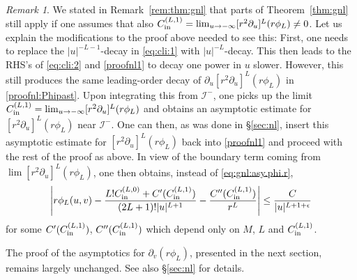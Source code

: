 \documentclass[11pt,english]{article}
\numberwithin{equation}{section}
\theoremstyle{remark}
\newtheorem{rem}{Remark}[section]
\theoremstyle{plain}
\theoremstyle{remark}
\newcommand{\pu}{\partial_u}
\newcommand{\pv}{\partial_v}
\renewcommand{\(}{\left(}
\renewcommand{\)}{\right)}
\begin{document}
\begin{rem}\label{rem:9}
We stated in Remark~\ref{rem:thm:gnl} that parts of Theorem~\ref{thm:gnl} still apply if one assumes that also $\cl{1}=\lim_{u\to-\infty}[r^2\pu]^L(r\phi_L)\neq 0$. 
Let us explain the modifications to the proof above needed to see this: 
First, one needs to replace the $|u|^{-L-1}$-decay in \eqref{eq:cli:1} with $|u|^{-L}$-decay. 
This then leads to the RHS's of \eqref{eq:cli:2} and \eqref{proofnl1} to decay one power in $u$ slower. 
However, this still produces the same leading-order decay of $\pu[r^2\pu]^L(r\phi_L)$ in \eqref{proofnl:Phipast}. 
Upon integrating this from $\mathcal I^-$, one picks up the limit $\cl{1}=\lim_{u\to-\infty}[r^2\pu]^L(r\phi_L)$ and obtains an asymptotic estimate for $[r^2\pu]^L(r\phi_L)$ near $\mathcal I^-$. 
One can then, as was done in \S \ref{sec:nl}, insert this asymptotic estimate for $[r^2\pu]^L(r\phi_L)$ back into \eqref{proofnl1} and proceed with the rest of the proof as above.
In view of the boundary term coming from $\lim [r^2\pu]^L(r\phi_L)$, one then obtains, instead of \eqref{eq:gnl:asy.phi.r},
\begin{equation}\label{eq:gnl:asy.phi.rrrrr}
\left|r\phi_L(u,v)-\frac{L!C_{\mathrm{in}}^{(L,0)}+C'(C_{\mathrm{in}}^{(L,1)})}{(2L+1)!|u|^{L+1}}-\frac{C''(C_{\mathrm{in}}^{(L,1)})}{r^L}\right|\leq\frac{C}{|u|^{L+1+\epsilon}}
\end{equation}
for some $C'(C_{\mathrm{in}}^{(L,1)})$, $C''(C_{\mathrm{in}}^{(L,1)})$ which depend only on $M$, $L$ and $C_{\mathrm{in}}^{(L,1)}$. 

The proof of the asymptotics for $\pv(r\phi_L)$, presented in the next section, remains largely unchanged. See also \S \ref{sec:nl} for details.
\end{rem}
\end{document}
